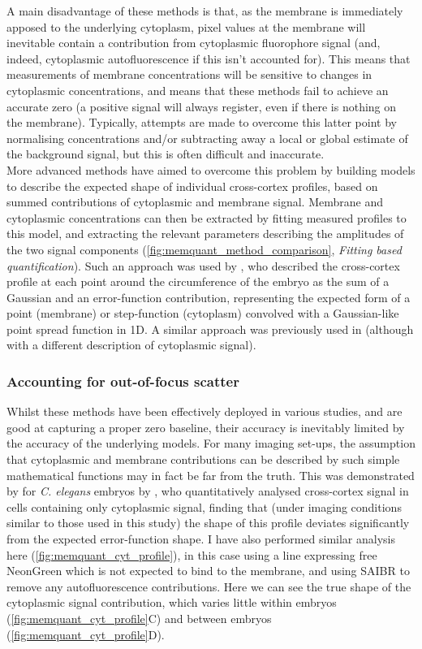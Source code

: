 \documentclass[12pt]{"article"}
\begin{document}
A main disadvantage of these methods is that, as the membrane is immediately apposed to the underlying cytoplasm, pixel values at the membrane will inevitable contain a contribution from cytoplasmic fluorophore signal (and, indeed, cytoplasmic autofluorescence if this isn't accounted for). This means that measurements of membrane concentrations will be sensitive to changes in cytoplasmic concentrations, and means that these methods fail to achieve an accurate zero (a positive signal will always register, even if there is nothing on the membrane). Typically, attempts are made to overcome this latter point by normalising concentrations and/or subtracting away a local or global estimate of the background signal, but this is often difficult and inaccurate.\\

More advanced methods have aimed to overcome this problem by building models to describe the expected shape of individual cross-cortex profiles, based on summed contributions of cytoplasmic and membrane signal. Membrane and cytoplasmic concentrations can then be extracted by fitting measured profiles to this model, and extracting the relevant parameters describing the amplitudes of the two signal components (\cref{fig:memquant_method_comparison}, \textit{Fitting based quantification}). Such an approach was used by \textcite{Gross2018}, who described the cross-cortex profile at each point around the circumference of the embryo as the sum of a Gaussian and an error-function contribution, representing the expected form of a point (membrane) or step-function (cytoplasm) convolved with a Gaussian-like point spread function in 1D. A similar approach was previously used in \textcite{Blanchoud2015} (although with a different description of cytoplasmic signal).\\

\subsubsection{Accounting for out-of-focus scatter}

Whilst these methods have been effectively deployed in various studies, and are good at capturing a proper zero baseline, their accuracy is inevitably limited by the accuracy of the underlying models. For many imaging set-ups, the assumption that cytoplasmic and membrane contributions can be described by such simple mathematical functions may in fact be far from the truth. This was demonstrated by for \textit{C. elegans} embryos by \textcite{Reich2019a}, who quantitatively analysed cross-cortex signal in cells containing only cytoplasmic signal, finding that (under imaging conditions similar to those used in this study) the shape of this profile deviates significantly from the expected error-function shape. I have also performed similar analysis here  (\cref{fig:memquant_cyt_profile}), in this case using a line expressing free NeonGreen which is not expected to bind to the membrane, and using SAIBR to remove any autofluorescence contributions. Here we can see the true shape of the cytoplasmic signal contribution, which varies little within embryos (\cref{fig:memquant_cyt_profile}C) and between embryos (\cref{fig:memquant_cyt_profile}D).\\
\end{document}
